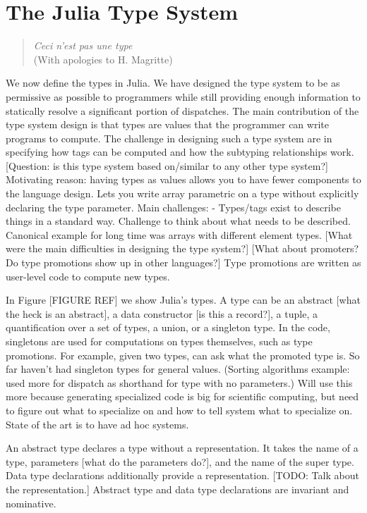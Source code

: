 \section{The Julia Type System}

\begin{quote}
  \textit{Ceci n'est pas une type} \\
  (With apologies to H. Magritte)
\end{quote}

We now define the types in Julia. We have designed the type system to be as permissive as possible to programmers while still providing enough information to statically resolve a significant portion of dispatches. The main contribution of the type system design is that types are values that the programmer can write programs to compute. The challenge in designing such a type system are in specifying how tags can be computed and how the subtyping relationships work. [Question: is this type system based on/similar to any other type system?]
Motivating reason: having types as values allows you to have fewer components to the language design. Lets you write array parametric on a type without explicitly declaring the type parameter.
Main challenges:
- Types/tags exist to describe things in a standard way. Challenge to think about what needs to be described. Canonical example for long time was arrays with different element types.
[What were the main difficulties in designing the type system?]
[What about promoters? Do type promotions show up in other languages?]
Type promotions are written as user-level code to compute new types.

In Figure [FIGURE REF] we show Julia’s types. A type can be an abstract [what the heck is an abstract], a data constructor [is this a record?], a tuple, a quantification over a set of types, a union, or a singleton type. In the code, singletons are used for computations on types themselves, such as type promotions. For example, given two types, can ask what the promoted type is. So far haven’t had singleton types for general values. (Sorting algorithms example: used more for dispatch as shorthand for type with no parameters.) Will use this more because generating specialized code is big for scientific computing, but need to figure out what to specialize on and how to tell system what to specialize on. State of the art is to have ad hoc systems.

An abstract type declares a type without a representation. It takes the name of a type, parameters [what do the parameters do?], and the name of the super type. Data type declarations additionally provide a representation. [TODO: Talk about the representation.]
Abstract type and data type declarations are invariant and nominative.


